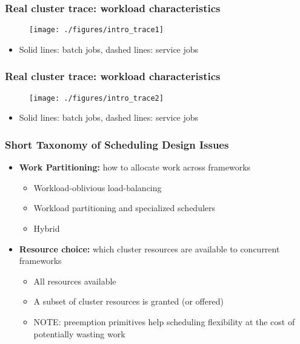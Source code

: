 \begin{frame}\frametitle{Real cluster trace: workload characteristics}
\begin{figure}[h]
  \centering
  \texttt{[image: ./figures/intro\_trace1]}
  \label{fig:intro_trace1}
\end{figure}
\begin{itemize}
	\item Solid lines: batch jobs, dashed lines: service jobs
\end{itemize}
\end{frame}

\begin{frame}\frametitle{Real cluster trace: workload characteristics}
\begin{figure}[h]
  \centering
  \texttt{[image: ./figures/intro\_trace2]}
  \label{fig:intro_trace2}
\end{figure}
\begin{itemize}
	\item Solid lines: batch jobs, dashed lines: service jobs
\end{itemize}
\end{frame}

\begin{frame}\frametitle{Short Taxonomy of Scheduling Design Issues}
\begin{itemize}
	\item {\bf Work Partitioning:} how to allocate work across frameworks
	\begin{itemize}
		\item Workload-oblivious load-balancing
		\item Workload partitioning and specialized schedulers
		\item Hybrid
	\end{itemize}

\vspace{20pt}

	\item {\bf Resource choice:} which cluster resources are available to concurrent frameworks
	\begin{itemize}
		\item All resources available
		\item A subset of cluster resources is granted (or offered)
		\item[] NOTE: preemption primitives help scheduling flexibility at the cost of potentially wasting work
	\end{itemize}
\end{itemize}
\end{frame}

